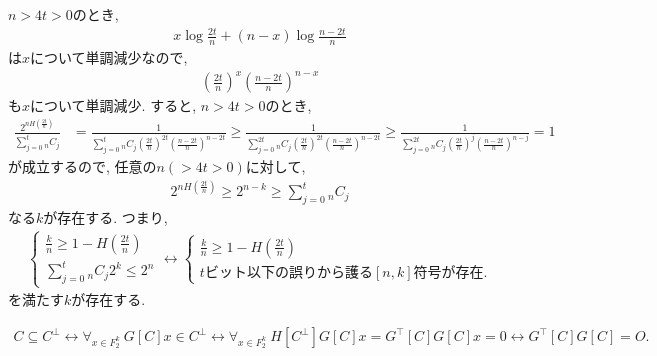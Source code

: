 \begin{ex}
    \label{ex10.23}
    $ n > 4t > 0 $のとき,
    \begin{align*}
        x \log \frac{2t}{n} + \left( n - x \right) \log \frac{ n - 2t}{n}
    \end{align*}
    は$x$について単調減少なので,
    \begin{align*}
        \left( \frac{2t}{n}\right)^{x} \left( \frac{ n - 2t}{n}\right)^{n - x}
    \end{align*}
    も$x$について単調減少. すると,  $ n > 4t > 0 $のとき,
    \begin{align*}
        \frac{2^{n H\left(\frac{2t}{n}\right)}}{\sum_{j=0}^t {}_n C_j}
         & =
        \frac{1}{\sum_{j=0}^t {}_n C_j \left( \frac{2t}{n}\right)^{2t} \left(\frac{n-2t}{n} \right)^{n-2t}}
        \geq
        \frac{1}{\sum_{j=0}^{2t} {}_n C_j \left( \frac{2t}{n}\right)^{2t} \left(\frac{n-2t}{n} \right)^{n-2t}}
        \geq
        \frac{1}{\sum_{j=0}^{2t} {}_n C_j \left( \frac{2t}{n}\right)^{j} \left(\frac{n-2t}{n} \right)^{n-j}}= 1
    \end{align*}
    が成立するので, 任意の$n (>4t > 0)$に対して,
    \begin{align*}
        2^{n H\left(\frac{2t}{n}\right)} \ge 2^{n-k} \ge \sum_{j=0}^t {}_n C_j
    \end{align*}
    なる$k$が存在する.
    つまり,
    \begin{align*}
        \begin{cases}
            \frac{k}{n} \ge 1 - H \left( \frac{2t}{n}\right) \\
            \sum_{j=0}^t {}_n C_j 2^k \le 2^n
        \end{cases}
        \longleftrightarrow
        \begin{cases}
            \frac{k}{n} \ge 1 - H \left( \frac{2t}{n}\right) \\
            t ビット以下の誤りから護る[n,k]符号が存在.
        \end{cases}
    \end{align*}
    を満たす$k$が存在する.
\end{ex}

\begin{ex}
    \label{ex10.24}
    \begin{align*}
        C \subseteq C^\perp
        \longleftrightarrow
        \forall_{x \in F_2^k} \ G[C]x \in C^\perp
        \longleftrightarrow
        \forall_{x \in F_2^k} \ H[C^\perp]G[C] x =  G^\top[C]G[C] x = 0
        \longleftrightarrow
        G^\top[C]G[C] = O.
    \end{align*}
\end{ex}

